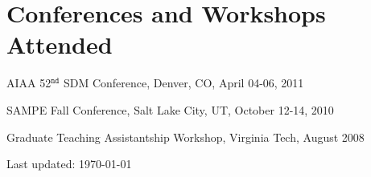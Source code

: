 \documentclass[10pt,letterpaper]{article}
\renewenvironment{itemize}{
  \begin{list}{}{
    \setlength{\leftmargin}{1.5em}
    \setlength{\itemsep}{0.25em}
    \setlength{\parskip}{0pt}
    \setlength{\parsep}{0.25em}
  }
}{
  \end{list}
}
\begin{document}
\section*{Conferences and Workshops Attended}

\begin{itemize}
\item AIAA 52$^{\texttt{nd}}$ SDM Conference, Denver, CO, April 04-06, 2011
\item SAMPE Fall Conference, Salt Lake City, UT, October 12-14, 2010
\item Graduate Teaching Assistantship Workshop, Virginia Tech, August 2008
\end{itemize}

\medskip

\begin{center}
  \begin{small}
    Last updated: \today
  \end{small}
\end{center}
\end{document}

